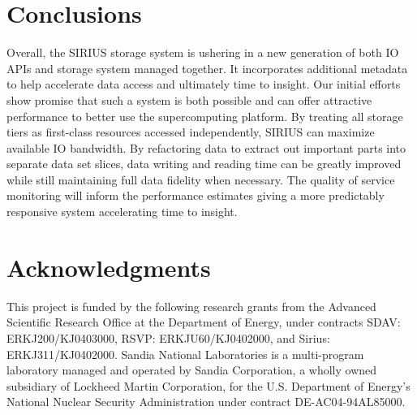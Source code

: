 \documentclass[letterpaper,twocolumn,10pt]{article}
\begin{document}
\section{Conclusions}
\label{sec:conclusion}

Overall, the SIRIUS storage system is ushering in a new generation of both IO
APIs and storage system managed together. It incorporates additional metadata
to help accelerate data access and ultimately time to insight. Our initial
efforts show promise that such a system is both possible and can offer
attractive performance to better use the supercomputing platform. By treating
all storage tiers as first-class resources accessed independently, SIRIUS can
maximize available IO bandwidth. By refactoring data to extract out important
parts into separate data set slices, data writing and reading time can be
greatly improved while still maintaining full data fidelity when necessary.
The quality of service monitoring will inform the performance estimates giving
a more predictably responsive system accelerating time to insight.

%
%

\section{Acknowledgments}

This project is funded by the following research grants from the Advanced
Scientific Research Office at the Department of Energy, under contracts SDAV:
ERKJ200/KJ0403000, RSVP: ERKJU60/KJ0402000, and Sirius: ERKJ311/KJ0402000.
Sandia National Laboratories is a multi-program laboratory managed and operated
by Sandia Corporation, a wholly owned subsidiary of Lockheed Martin
Corporation, for the U.S. Department of Energy's National Nuclear Security
Administration under contract DE-AC04-94AL85000.

{\footnotesize 
}

\end{document}

